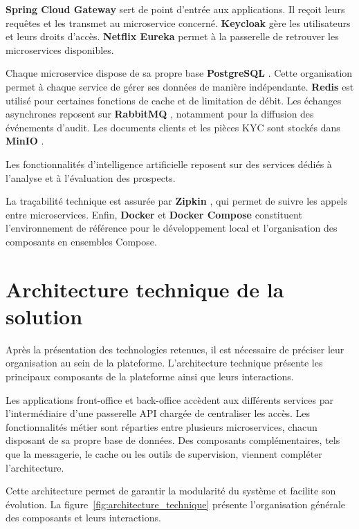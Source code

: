 \textbf{Spring Cloud Gateway} \cite{spring_gateway_docs} sert de point d'entrée
aux applications. Il reçoit leurs requêtes et les transmet au microservice
concerné. \textbf{Keycloak} \cite{keycloak_docs} gère les utilisateurs et leurs
droits d'accès. \textbf{Netflix Eureka} \cite{spring_eureka_docs} permet à la
passerelle de retrouver les microservices disponibles.

Chaque microservice dispose de sa propre base \textbf{PostgreSQL}
\cite{postgresql_docs}. Cette organisation permet à chaque service de gérer ses données de manière indépendante. \textbf{Redis}
\cite{redis_docs} est utilisé pour certaines fonctions de cache et de limitation de débit. Les échanges asynchrones reposent sur \textbf{RabbitMQ}
\cite{rabbitmq_docs}, notamment pour la diffusion des événements d'audit. Les documents clients et les pièces KYC sont stockés dans \textbf{MinIO}
\cite{minio_docs}.

Les fonctionnalités d'intelligence artificielle reposent sur des services dédiés à l'analyse et à l'évaluation des prospects.

La traçabilité technique est assurée par \textbf{Zipkin} \cite{zipkin_docs}, qui permet de
suivre les appels entre microservices. Enfin, \textbf{Docker} \cite{docker_docs} et
\textbf{Docker Compose} \cite{docker_compose_docs}
constituent l'environnement de référence pour le développement local et
l'organisation des composants en ensembles Compose.

\section{Architecture technique de la solution}


Après la présentation des technologies retenues, il est nécessaire de préciser leur organisation au sein de la plateforme.
L'architecture technique présente les principaux composants de la plateforme ainsi que leurs interactions.

Les applications front-office et back-office accèdent aux différents services par l'intermédiaire d'une passerelle API chargée de centraliser les accès. Les fonctionnalités métier sont réparties entre plusieurs microservices, chacun disposant de sa propre base de données. Des composants complémentaires, tels que la messagerie, le cache ou les outils de supervision, viennent compléter l'architecture.




Cette architecture permet de garantir la modularité du système et facilite son évolution. La figure~\ref{fig:architecture_technique} présente l’organisation générale des composants et leurs interactions.




